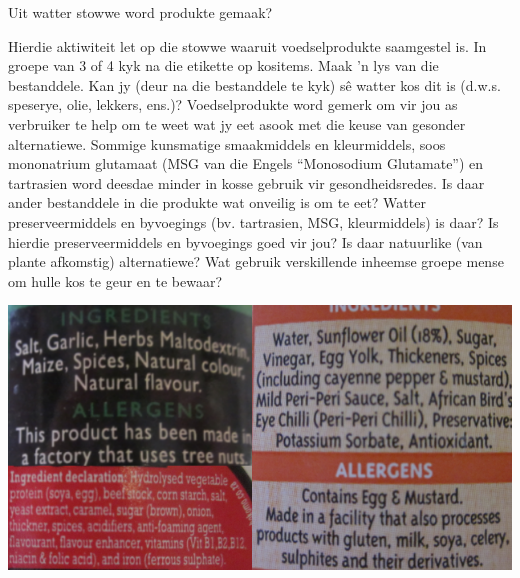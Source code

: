     \label{m38708*eip-344}\begin{activity}{Uit watter stowwe word produkte gemaak?}
{
\begin{minipage}{.5\textwidth}
Hierdie aktiwiteit let op die stowwe waaruit voedselprodukte saamgestel is. In groepe van 3 of 4 kyk na die etikette op kositems. Maak 'n lys van die bestanddele. Kan jy (deur na die bestanddele te kyk) s\^e watter kos dit is (d.w.s. speserye, olie, lekkers, ens.)? Voedselprodukte word gemerk om vir jou as verbruiker te help om te weet wat jy eet asook met die keuse van gesonder alternatiewe. Sommige kunsmatige smaakmiddels en kleurmiddels, soos mononatrium glutamaat (MSG van die Engels ``Monosodium Glutamate'') en tartrasien word deesdae minder in kosse gebruik vir gesondheidsredes. Is daar ander bestanddele in die produkte wat onveilig is om te eet? Watter preserveermiddels en byvoegings (bv. tartrasien, MSG, kleurmiddels) is daar? Is hierdie preserveermiddels en byvoegings goed vir jou? Is daar natuurlike (van plante afkomstig) alternatiewe? Wat gebruik verskillende inheemse groepe mense om hulle kos te geur en te bewaar?
\end{minipage}
\begin{minipage}{.5\textwidth}
 \begin{center}
 \includegraphics[width=.8\textwidth]{photos/food_labels.png}\par
\end{center}
\end{minipage}

 }  \end{activity}
